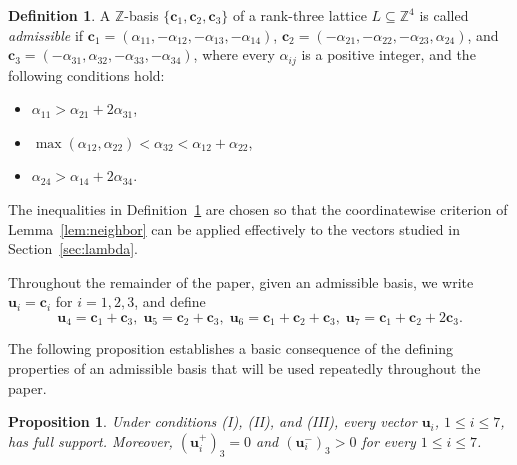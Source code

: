 \documentclass[12pt,a4paper]{amsart}
\newtheorem{proposition}[theorem]{Proposition}
\theoremstyle{definition}
\newtheorem{definition}[theorem]{Definition}
\begin{document}
\begin{definition}\label{def:setup} A $\mathbb Z$-basis
$\{\mathbf c_1,\mathbf c_2,\mathbf c_3\}$ of a rank-three lattice
$L\subseteq\mathbb Z^4$ is called \emph{admissible} if $\mathbf c_1=(\alpha_{11},-\alpha_{12},-\alpha_{13},-\alpha_{14})$,
$\mathbf c_2=(-\alpha_{21},-\alpha_{22},-\alpha_{23},\alpha_{24})$, and
$\mathbf c_3=(-\alpha_{31},\alpha_{32},-\alpha_{33},-\alpha_{34})$,
where every $\alpha_{ij}$ is a positive integer, and the following conditions hold:
\begin{itemize}
\item[\textbf{(I)}]
$\alpha_{11}>\alpha_{21}+2\alpha_{31}$,
\item[\textbf{(II)}]
$\max(\alpha_{12},\alpha_{22})<\alpha_{32}
<\alpha_{12}+\alpha_{22}$,
\item[\textbf{(III)}]
$\alpha_{24}>\alpha_{14}+2\alpha_{34}$.
\end{itemize}

\end{definition}

The inequalities in Definition~\ref{def:setup} are chosen so that the
coordinatewise criterion of Lemma~\ref{lem:neighbor} can be applied
effectively to the vectors studied in
Section~\ref{sec:lambda}.

Throughout the remainder of the paper, given an admissible basis, we
write $\mathbf u_i=\mathbf c_i$ for $i=1,2,3$, and define
\[
\mathbf u_4=\mathbf c_1+\mathbf c_3,\;
\mathbf u_5=\mathbf c_2+\mathbf c_3,\;
\mathbf u_6=\mathbf c_1+\mathbf c_2+\mathbf c_3,\;
\mathbf u_7=\mathbf c_1+\mathbf c_2+2\mathbf c_3.
\]

The following proposition establishes a basic consequence of the
defining properties of an admissible basis that will be used
repeatedly throughout the paper.

\begin{proposition}\label{prop:full-support} Under conditions
\textup{(I)}, \textup{(II)}, and \textup{(III)}, every vector $\mathbf u_i$, $1\le i\le7$, has full support. Moreover, $(\mathbf u_i^+)_3=0$ and $(\mathbf u_i^-)_3>0$ for every $1 \leq i \leq 7$.
\end{proposition}
\end{document}

